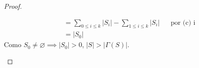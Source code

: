 \begin{proof}
\begin{enumerate}
\begin{align}
        &= \sum \limits_{0 \le i \le k} \left| S_i \right| - \sum \limits_{1 \le i \le k} \left| S_i \right| && \text{por (c) i}\\
        &= \left| S_0 \right|
    \end{align}
    Como $S_0 \neq \varnothing \implies \left| S_0 \right| > 0$, $\left| S \right| > \left| \Gamma(S) \right|$.
%    

\end{enumerate}
\end{proof}
